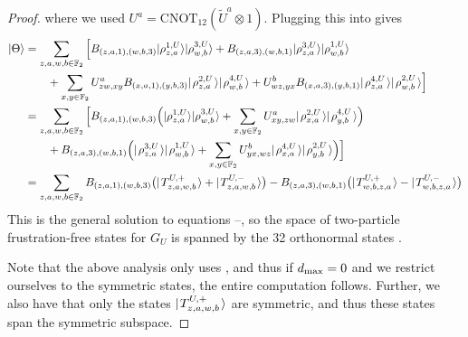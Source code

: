 \documentclass[../thesis-main/thesis-main]{subfiles}
\begin{document}
\begin{proof}
where we used $U^a=\mathrm{CNOT}_{12} (\tilde U^a\otimes 1)$. Plugging this into  gives 
\begin{align}
|\Theta\rangle  &= \sum_{z,a,w,b\in \mathbb{F}_2 }\Big[B_{\left(z,a,1\right),\left(w,b,3\right)}|\rho_{z,a}^{1,U}\rangle|\rho_{w,b}^{3,U}\rangle + B_{\left(z,a,3\right),\left(w,b,1\right)}|\rho_{z,a}^{3,U}\rangle|\rho_{w,b}^{1,U}\rangle\nonumber\\
  &\qquad + \sum_{x,y\in\mathbb{F}_2} U^a_{zw,xy} B_{(x,a,1),(y,b,3)} |\mspace{2mu} \rho_{z,a}^{2,U} \mspace{2mu} \rangle|\mspace{2mu} \rho_{w,b}^{4,U} \mspace{2mu} \rangle + U^b_{wz,yx} B_{(x,a,3),(y,b,1)} |\mspace{2mu} \rho_{z,a}^{4,U} \mspace{2mu} \rangle|\mspace{2mu} \rho_{w,b}^{2,U} \mspace{2mu} \rangle\Big]\\
   &= \sum_{z,a,w,b\in \mathbb{F}_2 }\Big[B_{\left(z,a,1\right),\left(w,b,3\right)}\Big(|\rho_{z,a}^{1,U}\rangle|\rho_{w,b}^{3,U}\rangle 
    +  \sum_{x,y\in\mathbb{F}_2} U^a_{xy,zw} |\mspace{2mu} \rho_{x,a}^{2,U} \mspace{2mu} \rangle|\mspace{2mu} \rho_{y,b}^{4,U} \mspace{2mu} \rangle\Big) \nonumber\\
  &  \qquad + B_{(z,a,3),(w,b,1)} \Big(|\mspace{2mu} \rho_{z,a}^{3,U} \mspace{2mu} \rangle|\mspace{2mu} \rho_{w,b}^{1,U} \mspace{2mu} \rangle 
    + \sum_{x,y\in\mathbb{F}_2} U^b_{yx,wz} |\mspace{2mu} \rho_{x,a}^{4,U} \mspace{2mu} \rangle|\mspace{2mu} \rho_{y,b}^{2,U} \mspace{2mu} \rangle\Big)\Big]\\
   &= \sum_{z,a,w,b\in\mathbb{F}_2} B_{(z,a,1),(w,b,3)} \big( |\mspace{2mu} T_{z,a,w,b}^{U,+} \mspace{2mu} \rangle + |\mspace{2mu} T_{z,a,w,b}^{U,-} \mspace{2mu} \rangle\big) - B_{(z,a,3),(w,b,1)} \big(|\mspace{2mu} T_{w,b,z,a}^{U,+} \mspace{2mu} \rangle - |\mspace{2mu} T_{w,b,z,a}^{U,-} \mspace{2mu} \rangle\big)
\end{align}
This is the general solution to equations --, so the space of two-particle frustration-free states for $G_U$ is spanned by the 32 orthonormal states .

Note that the above analysis only uses , and thus if $d_{\text{max}} = 0$ and we restrict ourselves to the symmetric states, the entire computation follows.  Further, we also have that only the states $|\mspace{2mu} T_{z,a,w,b}^{U,+} \mspace{2mu} \rangle$ are symmetric, and thus these states span the symmetric subspace.


\end{proof}
\end{document}
